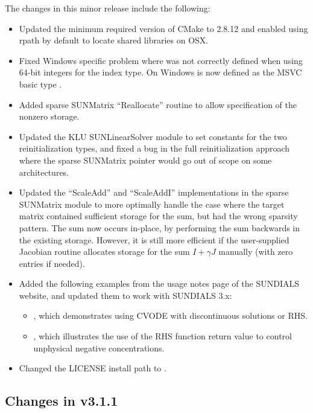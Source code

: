 The changes in this minor release include the following:
\begin{itemize}
\item Updated the minimum required version of CMake to 2.8.12 and enabled
  using rpath by default to locate shared libraries on OSX.
\item Fixed Windows specific problem where  was not correctly 
  defined when using 64-bit integers for the {\sundials} index type. On Windows
   is now defined as the MSVC basic type .
\item Added sparse SUNMatrix ``Reallocate'' routine to allow specification of
  the nonzero storage.
\item Updated the KLU SUNLinearSolver module to set constants for the two
  reinitialization types, and fixed a bug in the full reinitialization
  approach where the sparse SUNMatrix pointer would go out of scope on
  some architectures.
\item Updated the ``ScaleAdd'' and ``ScaleAddI'' implementations in the
  sparse SUNMatrix module to more optimally handle the case where the
  target matrix contained sufficient storage for the sum, but had the
  wrong sparsity pattern.  The sum now occurs in-place, by performing
  the sum backwards in the existing storage.  However, it is still more
  efficient if the user-supplied Jacobian routine allocates storage for
  the sum $I+\gamma J$ manually (with zero entries if needed).
\item Added the following examples from the usage notes page of the SUNDIALS website,
  and updated them to work with SUNDIALS 3.x:
  \begin{itemize}
  \item {}, which demonstrates using CVODE with 
    discontinuous solutions or RHS.
  \item {}, which illustrates the 
    use of the RHS function return value to control unphysical negative
    concentrations.
  \end{itemize}
\item Changed the LICENSE install path to .
\end{itemize}

\subsection*{Changes in v3.1.1}

